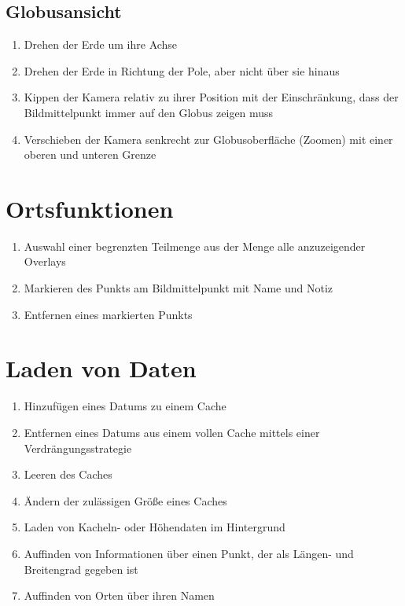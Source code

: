 \documentclass[10pt]{scrreprt}
\newcommand{\ziel}[1]{{\fontsize{9.5}{11}\textsf{/#1/}}}
\newcommand{\ziellabel}{Z}
\newcommand{\muss}{\renewcommand{\labelenumi}{\textbf{\ziel{\ziellabel\numprint{\theenumi}0}}}}
\newcommand{\wunsch}{\renewcommand{\labelenumi}{\textbf{\ziel{\ziellabel\numprint{\theenumi}0W}}}}
\begin{document}
\subsection{Globusansicht}
\begin{enumerate}[leftmargin=2.2cm,resume]
\item Drehen der Erde um ihre Achse
\item Drehen der Erde in Richtung der Pole, aber nicht über sie hinaus
\item Kippen der Kamera relativ zu ihrer Position mit der Einschränkung, dass der Bildmittelpunkt immer auf den Globus zeigen muss
\item Verschieben der Kamera senkrecht zur Globusoberfläche (Zoomen) mit einer oberen und unteren Grenze
\end{enumerate}

\section{Ortsfunktionen}
\begin{enumerate}[leftmargin=2.2cm,resume]
\item Auswahl einer begrenzten Teilmenge aus der Menge alle anzuzeigender Overlays
\wunsch
\item Markieren des Punkts am Bildmittelpunkt mit Name und Notiz
\item Entfernen eines markierten Punkts
\muss
\end{enumerate}

\section{Laden von Daten}
\begin{enumerate}[resume,leftmargin=2.2cm]
\item Hinzufügen eines Datums zu einem Cache
\item Entfernen eines Datums aus einem vollen Cache mittels einer Verdrängungsstrategie
\item Leeren des Caches
\item Ändern der zulässigen Größe eines Caches
\item Laden von Kacheln- oder Höhendaten im Hintergrund
\item Auffinden von Informationen über einen Punkt, der als Längen- und Breitengrad gegeben ist
\item Auffinden von Orten über ihren Namen
\end{enumerate}
\end{document}
